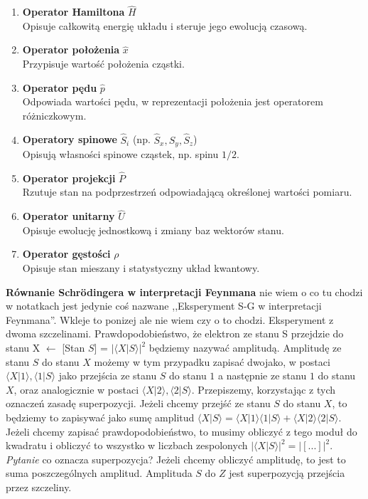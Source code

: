 \begin{enumerate}
  \item \textbf{Operator Hamiltona} \(\hat{H}\) \\
    Opisuje całkowitą energię układu i steruje jego ewolucją czasową.

  \item \textbf{Operator położenia} \(\hat{x}\) \\
    Przypisuje wartość położenia cząstki.

  \item \textbf{Operator pędu} \(\hat{p}\) \\
    Odpowiada wartości pędu, w reprezentacji położenia jest operatorem różniczkowym.

  \item \textbf{Operatory spinowe} \(\hat{S}_i\) (np. \(\hat{S}_x, \hat{S}_y, \hat{S}_z\)) \\
    Opisują własności spinowe cząstek, np. spinu \(1/2\).

  \item \textbf{Operator projekcji} \(\hat{P}\) \\
    Rzutuje stan na podprzestrzeń odpowiadającą określonej wartości pomiaru.

  \item \textbf{Operator unitarny} \(\hat{U}\) \\
    Opisuje ewolucję jednostkową i zmiany baz wektorów stanu.

  \item \textbf{Operator gęstości} \(\rho\) \\
    Opisuje stan mieszany i statystyczny układ kwantowy.
\end{enumerate}

\textbf{Równanie Schrödingera w interpretacji Feynmana}
nie wiem o co tu chodzi w notatkach jest jedynie coś nazwane ,,Eksperyment S-G w interpretacji Feynmana''. Wkleje to ponizej ale nie wiem czy o to chodzi. 
Eksperyment z dwoma szczelinami.
Prawdopodobieństwo, że elektron ze stanu S przejdzie do stanu X \newline [Stan $X$] $\leftarrow$ [Stan $S$] = $\vert\langle X\vert S\rangle\vert^2$ będziemy nazywać amplitudą.
Amplitudę ze stanu $S$ do stanu $X$ możemy w tym przypadku zapisać dwojako, w postaci $\langle X\vert1\rangle, \langle 1\vert S\rangle$ jako przejścia ze stanu $S$ do stanu $1$ a następnie ze stanu $1$ do stanu $X$, oraz analogicznie w postaci $\langle X\vert2\rangle , \langle 2\vert S\rangle$. Przepiszemy, korzystając z tych oznaczeń zasadę superpozycji. Jeżeli chcemy przejść ze stanu $S$ do stanu $X$, to będziemy to zapisywać jako sumę amplitud $\langle X\vert S\rangle = \langle X\vert1\rangle\langle 1\vert S\rangle + \langle X\vert2\rangle \langle 2\vert S\rangle$. Jeżeli chcemy zapisać prawdopodobieństwo, to musimy obliczyć z tego moduł do kwadratu i obliczyć to wszystko w liczbach zespolonych $\vert\langle X\vert S\rangle \vert^2 = \vert[...]\vert^2$. 
\textit{Pytanie} co oznacza superpozycja? Jeżeli chcemy obliczyć amplitudę, to jest to suma poszczególnych amplitud. Amplituda $S$ do $Z$ jest superpozycją przejścia przez szczeliny.
